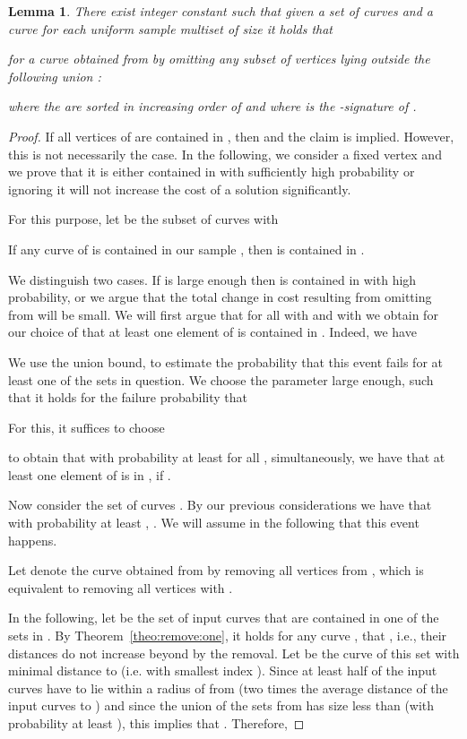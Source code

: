 \documentclass[11pt, letter]{article}
\newtheorem{lemma}[theorem]{Lemma}
\newcommand{\thmref}[1]{Theorem~\ref{theo:#1}}
\newcommand{\lemlab}[1]{\label{lemma:#1}}
\begin{document}
\begin{lemma}\lemlab{omit:low:prob}
There exist integer constant  such that given a
set of curves   and a curve  for each uniform
sample multiset  of size 
it holds that 
 
for a curve  obtained from  by omitting any subset of vertices lying outside 
the following union :

where the  are sorted in increasing order of  and where
 is the -signature of .
\end{lemma}
\begin{proof}
If all vertices of  are contained in , then  and the claim is implied.
However, this is not necessarily the case. In the following, we consider a fixed vertex  
and we prove that it is either contained in  with sufficiently high probability or
ignoring it will not increase the cost of a solution significantly. 

For this purpose, let  be the subset of curves  with 
 
If any curve of  is contained in our sample , then  is
contained in .

We distinguish two cases.  If  is large enough then  is
contained in  with high probability, or we argue that the total change in cost resulting 
from omitting  from  will be small.  
We will first argue that for all  with  and with  we obtain for our choice of  that at least one element of  is contained in . Indeed, we have

We use the union bound, to estimate the probability that this event fails for at least one of the 
sets  in question. We choose the parameter  large
enough, such that it holds for the failure probability that

For this, it suffices to choose 

to obtain that with probability at least  for all , simultaneously,
we have that at least one element of  is in , if .

Now consider the set of curves .
By our previous considerations we have that with probability at least ,
. We will assume in the following
that this event happens.

Let  denote the curve obtained from  by removing all vertices from
, which is equivalent to removing all vertices  with . 

In the following, let  be the set of input curves that are
contained in one of the sets in .
By \thmref{remove:one}, it holds for any curve , that 
, i.e., 
their distances do not increase 
beyond 
by the removal. 
Let  be the curve of this set with minimal distance to 
(i.e. with smallest index ).  
Since at least half of the input curves have to lie within a radius of  from  (two times the average distance of the input curves to )
and since the union of the sets from  has size less than  (with probability at least
), this implies that .
Therefore,

\end{proof}
\end{document}
